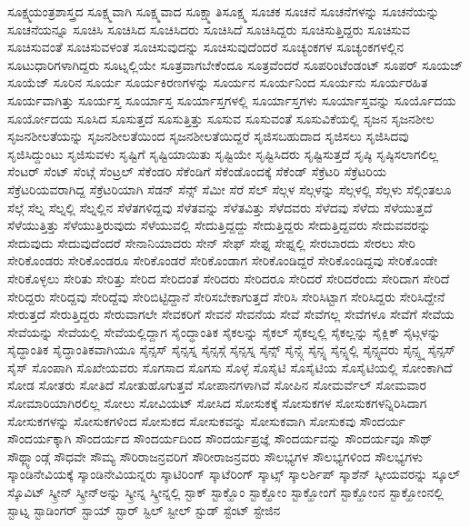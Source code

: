 {ಸೂಕ್ಷ್ಮಯಂತ್ರಶಾಸ್ತ್ರದ
ಸೂಕ್ಷ್ಮವಾಗಿ
ಸೂಕ್ಷ್ಮವಾದ
ಸೂಕ್ಷ್ಮಾತಿಸೂಕ್ಷ್ಮ
ಸೂಚಕ
ಸೂಚನೆ
ಸೂಚನೆಗಳನ್ನು
ಸೂಚನೆಯನ್ನು
ಸೂಚನೆಯನ್ನೂ
ಸೂಚಿಸಿ
ಸೂಚಿಸಿದ
ಸೂಚಿಸಿದರು
ಸೂಚಿಸಿದೆ
ಸೂಚಿಸಿದ್ದರು
ಸೂಚಿಸುತ್ತಿದ್ದರು
ಸೂಚಿಸುವ
ಸೂಚಿಸುವಂತೆ
ಸೂಚಿಸುವಳಂತೆ
ಸೂಚಿಸುವುದನ್ನು
ಸೂಚಿಸುವುದೆಂದರೆ
ಸೂಚ್ಯಂಕಗಳ
ಸೂಚ್ಯಂಕಗಳಲ್ಲಿನ
ಸೂಟುಧಾರಿಗಳಾಗಿದ್ದರು
ಸೂಟ್ನಲ್ಲಿಯೇ
ಸೂತ್ರವಾಗಬೇಕೆಂದೂ
ಸೂತ್ರವೆಂದರೆ
ಸೂಪರಿಂಟೆಂಡಂಟ್
ಸೂಪರ್
ಸೂಯಜ್
ಸೂಯೆಜ್
ಸೂರಿನ
ಸೂರ್ಯ
ಸೂರ್ಯಕಿರಣಗಳನ್ನು
ಸೂರ್ಯನ
ಸೂರ್ಯನಿಂದ
ಸೂರ್ಯನು
ಸೂರ್ಯರಹಿತ
ಸೂರ್ಯವಾಗಿತ್ತು
ಸೂರ್ಯಸ್ತ
ಸೂರ್ಯಾಸ್ತ
ಸೂರ್ಯಾಸ್ತಗಳಲ್ಲಿ
ಸೂರ್ಯಾಸ್ತಗಳು
ಸೂರ್ಯಾಸ್ತವನ್ನು
ಸೂರ್ಯೊದಯ
ಸೂರ್ಯೋದಯ
ಸೂಸಿದ
ಸೂಸುತ್ತದೆ
ಸೂಸುತ್ತಿತ್ತು
ಸೂಸುವ
ಸೂಸುವಂತೆ
ಸೂಸುವಿಕೆಯಲ್ಲಿ
ಸೃಜನ
ಸೃಜನಶೀಲ
ಸೃಜನಶೀಲತೆಯನ್ನು
ಸೃಜನಶೀಲತೆಯಿಂದ
ಸೃಜನಶೀಲತೆಯಿದ್ದರೆ
ಸೃಜಿಸಬಹುದಾದ
ಸೃಜಿಸಲು
ಸೃಜಿಸಿದವು
ಸೃಜಿಸಿದ್ದುಂಟು
ಸೃಜಿಸುವಳು
ಸೃಷ್ಟಿಗೆ
ಸೃಷ್ಟಿಯಾಯಿತು
ಸೃಷ್ಟಿಯೇ
ಸೃಷ್ಟಿಸಿದರು
ಸೃಷ್ಟಿಸುತ್ತದೆ
ಸೃಷ್ಠಿ
ಸೃಷ್ಠಿಸಲಾಗಲಿಲ್ಲ
ಸೆಂಟರ್
ಸೆಂಟ್
ಸೆಂಟ್ಗೆ
ಸೆಂಟ್ರಲ್
ಸೆಕೆಂಡರಿ
ಸೆಕೆಂಡಿಗೆ
ಸೆಕೆಂಡೊಂದಕ್ಕೆ
ಸೆಕೆಂಡ್
ಸೆಕ್ರೆಟರಿ
ಸೆಕ್ರೆಟರಿಯ
ಸೆಕ್ರೆಟರಿಯವರಾಗಿದ್ದ
ಸೆಕ್ರೆಟರಿಯಾಗಿ
ಸೆಡನ್
ಸೆನ್ಸ್
ಸೆಮೀ
ಸೆರೆ
ಸೆಲ್
ಸೆಲ್ಗಳ
ಸೆಲ್ಗಳನ್ನು
ಸೆಲ್ಗಳಲ್ಲಿ
ಸೆಲ್ಗಳು
ಸೆಲ್ಗಿಂತಲೂ
ಸೆಲ್ಗೆ
ಸೆಲ್ನ
ಸೆಲ್ನಲ್ಲಿ
ಸೆಲ್ನಲ್ಲಿನ
ಸೆಳೆತಗಳಿದ್ದವು
ಸೆಳೆತವನ್ನು
ಸೆಳೆತವಿತ್ತು
ಸೆಳೆದವರು
ಸೆಳೆದವು
ಸೆಳೆದು
ಸೆಳೆಯುತ್ತದೆ
ಸೆಳೆಯುತ್ತಿತ್ತು
ಸೆಳೆಯುತ್ತಿರುವುದು
ಸೆಳೆಯುವಲ್ಲಿ
ಸೇದುತ್ತಿದ್ದದ್ದು
ಸೇದುತ್ತಿದ್ದರು
ಸೇದುತ್ತಿದ್ದವರು
ಸೇದುವವರನ್ನು
ಸೇದುವುದು
ಸೇದುವುದೆಂದರೆ
ಸೇನಾನಿಯಾದರು
ಸೇನ್
ಸೇಫ್
ಸೇಫ್ನ
ಸೇಫ್ನಲ್ಲಿ
ಸೇರಬಾರದು
ಸೇರಲು
ಸೇರಿ
ಸೇರಿಕೊಂಡರು
ಸೇರಿಕೊಂಡರೂ
ಸೇರಿಕೊಂಡರೆ
ಸೇರಿಕೊಂಡಾಗ
ಸೇರಿಕೊಂಡಿದ್ದರೆ
ಸೇರಿಕೊಂಡಿದ್ದವು
ಸೇರಿಕೊಂಡೇ
ಸೇರಿಕೊಳ್ಳಲು
ಸೇರಿತು
ಸೇರಿತ್ತು
ಸೇರಿದ
ಸೇರಿದಂತೆ
ಸೇರಿದರು
ಸೇರಿದರೂ
ಸೇರಿದರೆ
ಸೇರಿದರೆಂದು
ಸೇರಿದಾಗ
ಸೇರಿದೆ
ಸೇರಿದ್ದರು
ಸೇರಿದ್ದವು
ಸೇರಿದ್ದೆವು
ಸೇರಿಬಿಟ್ಟಿದ್ದಾನೆ
ಸೇರಿಸಬೇಕಾಗುತ್ತದೆ
ಸೇರಿಸಿ
ಸೇರಿಸಿಟ್ಟಾಗ
ಸೇರಿಸಿದ್ದರು
ಸೇರಿಸಿದ್ದೇನೆ
ಸೇರುತ್ತದೆ
ಸೇರುತ್ತಿದ್ದರು
ಸೇರುವಾಗಲೇ
ಸೇವಕರಿಗೆ
ಸೇವನೆ
ಸೇವನೆಯ
ಸೇವೆ
ಸೇವೆಗಲ್ಲ
ಸೇವೆಗಳೂ
ಸೇವೆಗೆ
ಸೇವೆಯ
ಸೇವೆಯನ್ನು
ಸೇವೆಯಲ್ಲಿ
ಸೇವೆಯಲ್ಲಿದ್ದಾಗ
ಸೈಂದ್ಧಾಂತಿಕ
ಸೈಕಲನ್ನು
ಸೈಕಲ್
ಸೈಕಲ್ನಲ್ಲಿ
ಸೈಕಲ್ಲನ್ನು
ಸೈಕ್ಲಿಕ್
ಸೈಟ್ಗಳನ್ನು
ಸೈದ್ಧಾಂತಿಕ
ಸೈದ್ಧಾಂತಿಕವಾಗಿಯೂ
ಸೈನ್ಸಸ್
ಸೈನ್ಸಸ್ನ
ಸೈನ್ಸಸ್ಗೆ
ಸೈನ್ಸಸ್ನ
ಸೈನ್ಸ್
ಸೈನ್ಸ್ಗೆ
ಸೈನ್ಸ್ನ
ಸೈನ್ಸ್ನಲ್ಲಿ
ಸೈನ್ಸ್ನವರು
ಸೈನ್ಸ್ಸ್ನ
ಸೈನ್ಸಸ್
ಸೈಸ್
ಸೊಂಪಾಗಿ
ಸೊಖೇಯವರು
ಸೊಗಸಾದ
ಸೊಗಸು
ಸೊಳ್ಳೆ
ಸೊಸೈಟಿ
ಸೊಸೈಟಿಯ
ಸೊಸೈಟಿಯಲ್ಲಿ
ಸೋಂಕಾಗಿದೆ
ಸೋಡ
ಸೋತರು
ಸೋತಿದೆ
ಸೋತುಹೊಗುತ್ತವೆ
ಸೋಪಾನಗಳಾಗಿವೆ
ಸೋಪಿನ
ಸೋಮರ್ವೆಲ್
ಸೋಮವಾರ
ಸೋಮಾರಿಯಾಗಿರಲಿಲ್ಲ
ಸೋಲು
ಸೋವಿಯಟ್
ಸೋಸಿದ
ಸೋಸುಕಕ್ಕೆ
ಸೋಸುಕಗಳ
ಸೋಸುಕಗಳನ್ನಿರಿಸಿದಾಗ
ಸೋಸುಕಗಳನ್ನು
ಸೋಸುಕಗಳಿಂದ
ಸೋಸುಕದ
ಸೋಸುಕವನ್ನು
ಸೋಸುಕವಾಗಿ
ಸೋಸುಕವು
ಸೌಂದರ್ಯ
ಸೌಂದರ್ಯಕ್ಕಾಗಿ
ಸೌಂದರ್ಯದ
ಸೌಂದರ್ಯದಿಂದ
ಸೌಂದರ್ಯಪ್ರಜ್ಞೆ
ಸೌಂದರ್ಯವನ್ನು
ಸೌಂದರ್ಯವೂ
ಸೌಥ್
ಸೌಥ್ಲ್ಯಾಂಡ್ಗೆ
ಸೌಧವೇ
ಸೌಮ್ಯ
ಸೌರಿರಾಜನ್ರವರಿಗೆ
ಸೌರೀರಾಜನ್ರವರು
ಸೌಲಭ್ಯಗಳ
ಸೌಲಭ್ಯಗಳಿಂದ
ಸೌಲಭ್ಯಗಳು
ಸ್ಕಾಂಡಿನೇವಿಯಕ್ಕೆ
ಸ್ಕಾಂಡಿನೇವಿಯನ್ನರು
ಸ್ಕಾಟಿರಿಂಗ್
ಸ್ಕಾಟೆರಿಂಗ್
ಸ್ಕಾಟ್ಸ್
ಸ್ಕಾಲರ್ಶಿಪ್
ಸ್ಕಾಶೆನ್
ಸ್ಕೀಯವರನ್ನು
ಸ್ಕೂಲ್
ಸ್ಕೊವಿಟ್
ಸ್ಕ್ರೀನ್
ಸ್ಕ್ರೀನ್ಅನ್ನು
ಸ್ಕ್ರೀನ್ನ
ಸ್ಕ್ರೀನ್ನಲ್ಲಿ
ಸ್ಟಾಕ್
ಸ್ಟಾಕ್ಹೊಂ
ಸ್ಟಾಕ್ಹೋಂ
ಸ್ಟಾಕ್ಹೋಂಗೆ
ಸ್ಟಾಕ್ಹೋಂನ
ಸ್ಟಾಕ್ಹೋಂನಲ್ಲಿ
ಸ್ಟಾಟ್ನ
ಸ್ಟಾಡಿಂಗರ್
ಸ್ಟಾಯ್
ಸ್ಟಾರ್
ಸ್ಟಿಲ್
ಸ್ಟೀಲ್
ಸ್ಟುಡ್
ಸ್ಟೆಂಟ್
ಸ್ಟೇಜಿನ
}
